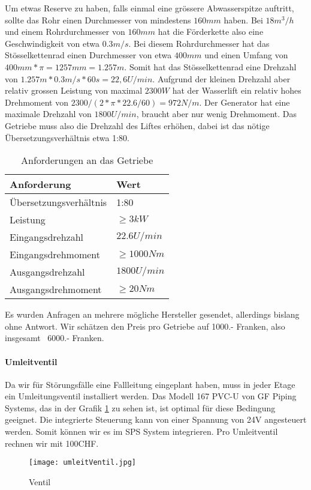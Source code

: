 Um etwas Reserve zu haben, falls einmal eine grössere Abwasserspitze auftritt, sollte das Rohr einen Durchmesser von mindestens \(160mm\) haben. Bei \(18 m^3 /h \) und einem Rohrdurchmesser von \(160mm\) hat die Förderkette also eine Geschwindigkeit von etwa \(0.3 m/s \). Bei diesem Rohrdurchmesser hat das Stösselkettenrad einen Durchmesser von etwa \(400mm\)\cite{schrage} und einen Umfang von \(400mm * \pi = 1257mm = 1.257m\). Somit hat das Stösselkettenrad eine Drehzahl von \(1.257m * 0.3 m/s * 60s = 22,6 U/min\). Aufgrund der kleinen Drehzahl aber relativ grossen Leistung von maximal \(2300 W\) hat der Wasserlift ein relativ hohes Drehmoment von \( 2300 /(2 * \pi * 22.6/ 60) = 972 N/m\). Der Generator hat eine maximale Drehzahl von \(1800 U/min\), braucht aber nur wenig Drehmoment. Das Getriebe muss also die Drehzahl des Liftes erhöhen, dabei ist das nötige Übersetzungsverhältnis etwa 1:80. 
\begin{table}
\small
\begin{center}
\begin{tabular}{ll}
\hline
\textbf{Anforderung}&\textbf{Wert}\\
\hline			
Übersetzungsverhältnis&1:80\\
Leistung&$\geq$\(3 kW\)\\		
Eingangsdrehzahl&\(22.6 U/min\)\\
Eingangsdrehmoment&$\geq$\(1000 Nm\)\\	
Ausgangsdrehzahl&\(1800 U/min\)\\
Ausgangsdrehmoment&$\geq$\(20 Nm\)\\
\hline
\end{tabular}
\caption{Anforderungen an das Getriebe}
\end{center}
\end{table}
Es wurden Anfragen an mehrere mögliche Hersteller gesendet, allerdings bislang ohne Antwort. Wir schätzen den Preis pro Getriebe auf 1000.- Franken, also insgesamt ~6000.- Franken.

\paragraph{Umleitventil}

Da wir für Störungsfälle eine Fallleitung eingeplant haben, muss in jeder Etage ein Umleitungsventil installiert werden. Das Modell 167 PVC-U von GF Piping Systems, das in der Grafik \ref{fig:Umleitungsventil} zu sehen ist, ist optimal für diese Bedingung geeignet. Die integrierte Steuerung kann von einer Spannung von 24V angesteuert werden. Somit können wir es im SPS System integrieren. Pro Umleitventil rechnen wir mit 100CHF.

 \begin{figure} [H]
	\centering
	\texttt{[image: umleitVentil.jpg]}
	\caption{Ventil \cite{Umleitungsventil}}%
	\label{fig:Umleitungsventil}
\end{figure}

